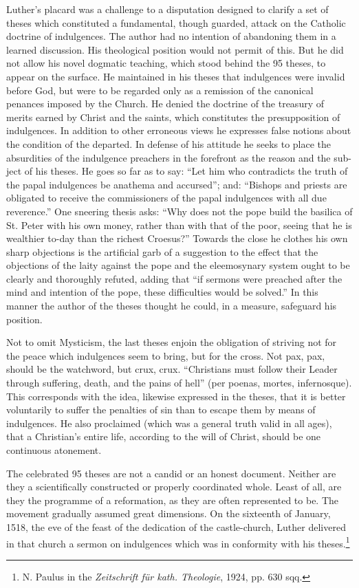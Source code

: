 Luther’s placard was a challenge to a disputation designed to clarify a
set of theses which constituted a fundamental, though guarded,
attack on the Catholic doctrine of indulgences. The author had no
intention of abandoning them in a learned discussion. His theological
position would not permit of this. But he did not allow his novel
dogmatic teaching, which stood behind the 95 theses, to appear on
the surface. He maintained in his theses that indulgences were invalid
before God, but were to be regarded only as a remission of the
canonical penances imposed by the Church. He denied the doctrine
of the treasury of merits earned by Christ and the saints, which
constitutes the presupposition of indulgences. In addition to other
erroneous views he expresses false notions about the condition of the
departed. In defense of his attitude he seeks to place the absurdities
of the indulgence preachers in the forefront as the reason and the sub-
ject of his theses. He goes so far as to say: “Let him who contradicts
the truth of the papal indulgences be anathema and accursed”; and:
“Bishops and priests are obligated to receive the commissioners of
the papal indulgences with all due reverence.” One sneering thesis
asks: “Why does not the pope build the basilica of St. Peter with his
own money, rather than with that of the poor, seeing that he is
wealthier to-day than the richest Croesus?” Towards the close he
clothes his own sharp objections is the artificial garb of a suggestion
to the effect that the objections of the laity against the pope and the
eleemosynary system ought to be clearly and thoroughly refuted,
adding that “if sermons were preached after the mind and intention
of the pope, these difficulties would be solved.” In this manner the
author of the theses thought he could, in a measure, safeguard his
position.

Not to omit Mysticism, the last theses enjoin the obligation of
striving not for the peace which indulgences seem to bring, but for
the cross. Not pax, pax, should be the watchword, but crux, crux.
“Christians must follow their Leader through suffering, death, and
the pains of hell” (per poenas, mortes, infernosque). This corresponds
with the idea, likewise expressed in the theses, that it is better voluntarily
to suffer the penalties of sin than to escape them by means of indulgences.
He also proclaimed (which was a general truth valid in
all ages), that a Christian’s entire life, according to the will of Christ,
should be one continuous atonement.

The celebrated 95 theses are not a candid or an honest document.
Neither are they a scientifically constructed or properly coordinated
whole. Least of all, are they the programme of a reformation, as they
are often represented to be.
The movement gradually assumed great dimensions. On the sixteenth
of January, 1518, the eve of the feast of the dedication of the
castle-church, Luther delivered in that church a sermon on indulgences
which was in conformity with his theses.\footnote
{N. Paulus in the \textit{Zeitschrift für kath. Theologie}, 1924, pp. 630 sqq.}


